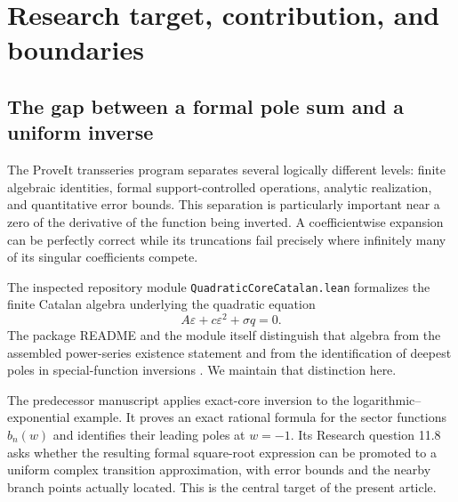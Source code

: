 \documentclass[11pt,a4paper]{article}
\theoremstyle{definition}
\theoremstyle{remark}
\begin{document}
\begin{titlepage}
\begin{abstract}
the quantitative specialization, crossover calculation, and support
construction, not a new general theory of analytic folds.
\end{abstract}
\vfill
\noindent{}
\end{titlepage}
\hypersetup{pageanchor=true}

{\small
\setlength{\parskip}{0pt}
\tableofcontents
}
\newpage

\section{Research target, contribution, and boundaries}
\label{sec:intro}

\subsection{The gap between a formal pole sum and a uniform inverse}
The ProveIt transseries program separates several logically different
levels: finite algebraic identities, formal support-controlled operations,
analytic realization, and quantitative error bounds. This separation is
particularly important near a zero of the derivative of the function
being inverted. A coefficientwise expansion can be perfectly correct
while its truncations fail precisely where infinitely many of its
singular coefficients compete.

The inspected repository module \texttt{QuadraticCoreCatalan.lean}
formalizes the finite Catalan algebra underlying the quadratic equation
\[
 A\varepsilon+c\varepsilon^2+\sigma q=0.
\]
The package README and the module itself distinguish that algebra from
the assembled power-series existence statement and from the identification
of deepest poles in special-function inversions
\cite{repo-readme,repo-catalan}. We maintain that distinction here.

The predecessor manuscript \cite{predecessor} applies exact-core inversion
to the logarithmic--exponential example. It proves an exact rational
formula for the sector functions $b_n(w)$ and identifies their leading
poles at $w=-1$. Its Research question 11.8 asks whether the resulting
formal square-root expression can be promoted to a uniform complex
transition approximation, with error bounds and the nearby branch points
actually located. This is the central target of the present article.
\end{document}
